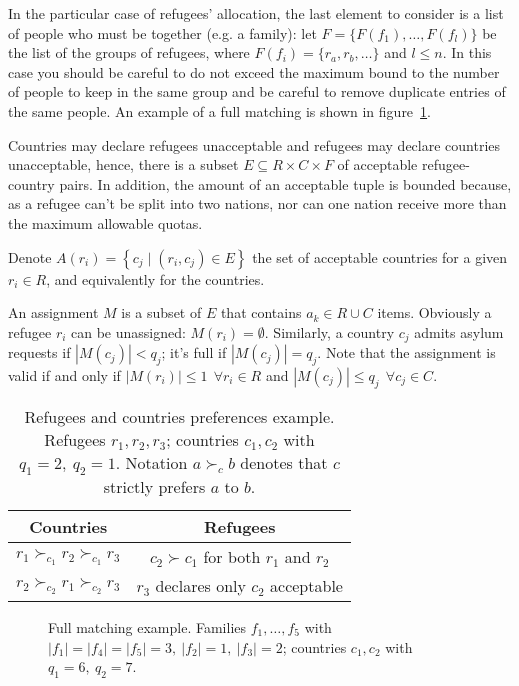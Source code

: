 In the particular case of refugees' allocation, the last element to consider is a list of people who must be together (e.g. a family): let \(F=\{F(f_1), \dots, F(f_l)\}\) be the list of the groups of refugees, where \(F(f_i) = \{r_a, r_b, \dots\}\) and \(l \leq n\).
In this case you should be careful to do not exceed the maximum bound to the number of people to keep in the same group and be careful to remove duplicate entries of the same people. An example of a full matching is shown in figure~\ref{fig:complete_matching}.

Countries may declare refugees unacceptable and refugees may declare countries unacceptable, hence, there is a subset \(E \subseteq R \times C \times F\) of acceptable refugee-country pairs.
In addition, the amount of an acceptable tuple is bounded because, as a refugee can't be split into two nations, nor can one nation receive more than the maximum allowable quotas.

Denote \(A \left( r_i \right) = \left\{ c_j \mid \left( r_i, c_j \right) \in E \right\}\) the set of acceptable countries for a given \(r_i \in R\), and equivalently for the countries.

An assignment \(M\) is a subset of \(E\) that contains \(a_k \in R \cup C\) items.
Obviously a refugee \(r_i\) can be unassigned: \(M \left( r_i \right) = \emptyset\).
Similarly, a country \(c_j\) admits asylum requests if \(\left| M \left( c_j \right) \right| < q_j\); it's full if \(\left| M \left( c_j \right) \right| = q_j\).
Note that the assignment is valid if and only if \(\left| M \left( r_i \right) \right| \leq 1\ \ \forall r_i \in R\) and \(\left| M \left( c_j \right) \right| \leq q_j\ \ \forall c_j \in C\).

\begin{table}[!htb]
    \centering
    \begin{tabular}{c|c}
        \hline Countries & Refugees \\
        \hline \(r_1 \succ_{c_1} r_2 \succ_{c_1} r_3\) & \(c_2 \succ c_1\) for both \(r_1\) and \(r_2\) \\
        \(r_2 \succ_{c_2} r_1 \succ_{c_2} r_3\) & \(r_3\) declares only \(c_2\) acceptable \\
        \hline
    \end{tabular}
    \caption{Refugees and countries preferences example. Refugees \(r_1, r_2, r_3\); countries \(c_1, c_2\) with \(q_1 = 2,\ q_2 = 1\). Notation \(a \succ_c b\) denotes that \(c\) strictly prefers \(a\) to \(b\).}
    \label{tab:countries-refugees}
\end{table}

\begin{figure}[!htb]
    \def\svgwidth{\columnwidth}
    
    \caption{Full matching example. Families \(f_1, \dots, f_5\) with \(|f_1|=|f_4|=|f_5|=3,\ |f_2|=1,\ |f_3|=2\); countries \(c_1, c_2\) with \(q_1 = 6,\ q_2 = 7\).}
    \label{fig:complete_matching}
\end{figure}
